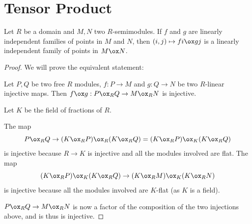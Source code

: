 \section{Tensor Product}


\begin{lemma}
  \label{0-tensor-lin-indep}
  \leanok
  \mathlibok

  Let $R$ be a domain and $M, N$ two $R$-semimodules.
  If $f$ and $g$ are linearly independent families of points in $M$ and $N$, then $(i, j) \mapsto f i \ox g j$ is a linearly independent family of points in $M \ox N$.
\end{lemma}
\begin{proof}
  \leanok
  We will prove the equivalent statement:

  Let $P, Q$ be two free $R$ modules, $f : P \to M$ and $g : Q \to N$ be two $R$-linear injective maps.
  Then $f \ox g : P \ox_R Q \to M \ox_R N$ is injective.

  Let $K$ be the field of fractions of $R$.

  The map
  \[ P \ox_R Q \to (K \ox_R P) \ox_R (K \ox_R Q) = (K \ox_R P) \ox_K (K \ox_R Q) \]
  is injective because $R \to K$ is injective and all the modules involved are flat.
  The map
  \[ (K \ox_R P) \ox_K (K \ox_R Q) \to (K \ox_R M) \ox_K (K \ox_R N) \]
  is injective because all the modules involved are $K$-flat (as $K$ is a field).

  $P \ox_R Q \to M \ox_R N$ is now a factor of the composition of the two injections above, and is thus is injective.
\end{proof}
